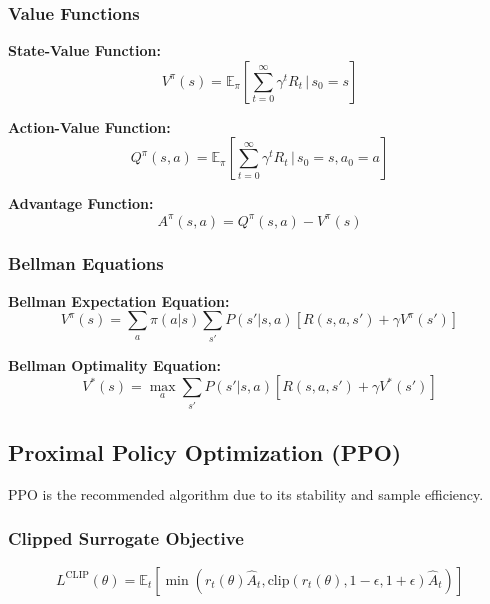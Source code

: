 \documentclass[11pt,a4paper]{article}
\newcommand{\E}{\mathbb{E}}
\begin{document}
\subsubsection{Value Functions}

\textbf{State-Value Function:}
\begin{equation}
  V^\pi(s) = \E_\pi \left[ \sum_{t=0}^{\infty} \gamma^t R_t \,\bigg|\, s_0 = s \right]
\end{equation}

\textbf{Action-Value Function:}
\begin{equation}
  Q^\pi(s, a) = \E_\pi \left[ \sum_{t=0}^{\infty} \gamma^t R_t \,\bigg|\, s_0 = s, a_0 = a \right]
\end{equation}

\textbf{Advantage Function:}
\begin{equation}
  A^\pi(s, a) = Q^\pi(s, a) - V^\pi(s)
\end{equation}

\subsubsection{Bellman Equations}

\textbf{Bellman Expectation Equation:}
\begin{equation}
  V^\pi(s) = \sum_a \pi(a|s) \sum_{s'} P(s'|s,a) \left[ R(s,a,s') + \gamma V^\pi(s') \right]
\end{equation}

\textbf{Bellman Optimality Equation:}
\begin{equation}
  V^*(s) = \max_a \sum_{s'} P(s'|s,a) \left[ R(s,a,s') + \gamma V^*(s') \right]
\end{equation}

\subsection{Proximal Policy Optimization (PPO)}

PPO is the recommended algorithm due to its stability and sample efficiency.

\subsubsection{Clipped Surrogate Objective}

\begin{equation}
  L^{\text{CLIP}}(\theta) = \E_t \left[ \min\left( r_t(\theta) \hat{A}_t, \text{clip}(r_t(\theta), 1-\epsilon, 1+\epsilon) \hat{A}_t \right) \right]
\end{equation}
\end{document}
